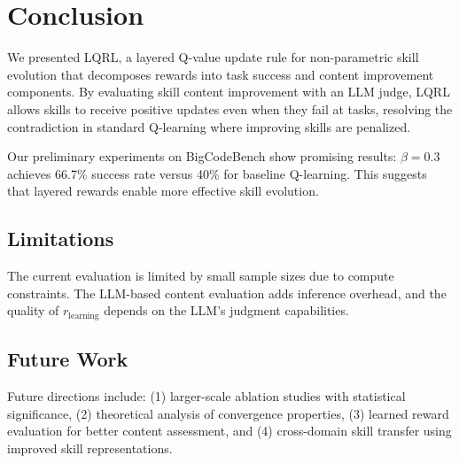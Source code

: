 \section{Conclusion}
\label{sec:conclusion}

We presented LQRL, a layered Q-value update rule for non-parametric skill evolution that decomposes rewards into task success and content improvement components. By evaluating skill content improvement with an LLM judge, LQRL allows skills to receive positive updates even when they fail at tasks, resolving the contradiction in standard Q-learning where improving skills are penalized.

Our preliminary experiments on BigCodeBench show promising results: $\beta=0.3$ achieves 66.7\% success rate versus 40\% for baseline Q-learning. This suggests that layered rewards enable more effective skill evolution.

\subsection{Limitations}

The current evaluation is limited by small sample sizes due to compute constraints. The LLM-based content evaluation adds inference overhead, and the quality of $r_{\text{learning}}$ depends on the LLM's judgment capabilities.

\subsection{Future Work}

Future directions include: (1) larger-scale ablation studies with statistical significance, (2) theoretical analysis of convergence properties, (3) learned reward evaluation for better content assessment, and (4) cross-domain skill transfer using improved skill representations.
